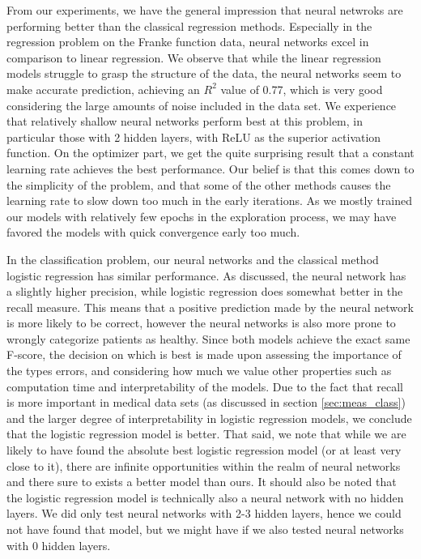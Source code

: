 From our experiments, we have the general impression that neural netwroks are performing better than the classical regression methods.
Especially in the regression problem on the Franke function data, neural networks excel in comparison to linear regression.
We observe that while the linear regression models struggle to grasp the structure of the data, the neural networks seem to make accurate prediction, achieving an $R^2$ value of 0.77, which is very good considering the large amounts of noise included in the data set.
We experience that relatively shallow neural networks perform best at this problem, in particular those with 2 hidden layers, with ReLU as the superior activation function.
On the optimizer part, we get the quite surprising result that a constant learning rate achieves the best performance.
Our belief is that this comes down to the simplicity of the problem, and that some of the other methods causes the learning rate to slow down too much in the early iterations.
As we mostly trained our models with relatively few epochs in the exploration process, we may have favored the models with quick convergence early too much.

In the classification problem, our neural networks and the classical method logistic regression has similar performance.
As discussed, the neural network has a slightly higher precision, while logistic regression does somewhat better in the recall measure.
This means that a positive prediction made by the neural network is more likely to be correct, however the neural networks is also more prone to wrongly categorize patients as healthy.
Since both models achieve the exact same F-score, the decision on which is best is made upon assessing the importance of the types errors, and considering how much we value other properties such as computation time and interpretability of the models.
Due to the fact that recall is more important in medical data sets (as discussed in section \ref{sec:meas_class}) and the larger degree of interpretability in logistic regression models, we conclude that the logistic regression model is better.
That said, we note that while we are likely to have found the absolute best logistic regression model (or at least very close to it), there are infinite opportunities within the realm of neural networks and there sure to exists a better model than ours.
It should also be noted that the logistic regression model is technically also a neural network with no hidden layers.
We did only test neural networks with 2-3 hidden layers, hence we could not have found that model, but we might have if we also tested neural networks with 0 hidden layers.

